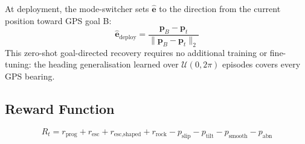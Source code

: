 \documentclass[conference]{IEEEtran}
\begin{document}
At deployment, the mode-switcher sets $\hat{\mathbf{e}}$ to the direction from the
current position toward GPS goal B:
\begin{equation}
  \hat{\mathbf{e}}_\text{deploy} =
  \frac{\mathbf{p}_B - \mathbf{p}_t}{\|\mathbf{p}_B - \mathbf{p}_t\|_2}
\end{equation}
This zero-shot goal-directed recovery requires no additional training or
fine-tuning: the heading generalisation learned over $\mathcal{U}(0,2\pi)$
episodes covers every GPS bearing.

\subsection{Reward Function}

\begin{equation}
  R_t = r_{\text{prog}} + r_{\text{esc}} + r_{\text{esc,shaped}}
        + r_{\text{rock}} - p_{\text{slip}} - p_{\text{tilt}}
        - p_{\text{smooth}} - p_{\text{abn}}
  \label{eq:reward}
\end{equation}
\end{document}
